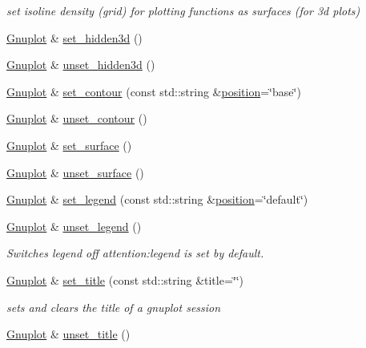 \begin{DoxyCompactItemize}
\begin{DoxyCompactList}\small\item\em set isoline density (grid) for plotting functions as surfaces (for 3d plots) \end{DoxyCompactList}\item 
\hyperlink{classGnuplot}{\-Gnuplot} \& \hyperlink{classGnuplot_a891f9800705eddc3f73886f265c009b8}{set\-\_\-hidden3d} ()
\item 
\hyperlink{classGnuplot}{\-Gnuplot} \& \hyperlink{classGnuplot_ab8688182047f746090e1e5f2a8c11c9e}{unset\-\_\-hidden3d} ()
\item 
\hyperlink{classGnuplot}{\-Gnuplot} \& \hyperlink{classGnuplot_af845efc728a90d7e10de764eff0b2423}{set\-\_\-contour} (const std\-::string \&\hyperlink{fri__example_8m_a6b7c93a885b43441f4e04026891e8c69}{position}=\char`\"{}base\char`\"{})
\item 
\hyperlink{classGnuplot}{\-Gnuplot} \& \hyperlink{classGnuplot_a0b8522cb81e46dd4f5a22b7b48f977b1}{unset\-\_\-contour} ()
\item 
\hyperlink{classGnuplot}{\-Gnuplot} \& \hyperlink{classGnuplot_a9825bd26500e30ca88404c4807e6607a}{set\-\_\-surface} ()
\item 
\hyperlink{classGnuplot}{\-Gnuplot} \& \hyperlink{classGnuplot_a4ebddacbec61aa3e7bc4b89f508ad621}{unset\-\_\-surface} ()
\item 
\hyperlink{classGnuplot}{\-Gnuplot} \& \hyperlink{classGnuplot_ad64a717dac18167f656c4f09239973f8}{set\-\_\-legend} (const std\-::string \&\hyperlink{fri__example_8m_a6b7c93a885b43441f4e04026891e8c69}{position}=\char`\"{}default\char`\"{})
\item 
\hyperlink{classGnuplot}{\-Gnuplot} \& \hyperlink{classGnuplot_ace901a18ab1a459213afd3ee0233b5ce}{unset\-\_\-legend} ()
\begin{DoxyCompactList}\small\item\em \-Switches legend off attention\-:legend is set by default. \end{DoxyCompactList}\item 
\hyperlink{classGnuplot}{\-Gnuplot} \& \hyperlink{classGnuplot_a4f93bac0e69dd83806652ca7226c6b3b}{set\-\_\-title} (const std\-::string \&title=\char`\"{}\char`\"{})
\begin{DoxyCompactList}\small\item\em sets and clears the title of a gnuplot session \end{DoxyCompactList}\item 
\hyperlink{classGnuplot}{\-Gnuplot} \& \hyperlink{classGnuplot_aca0aeb1dc0ac8d7e68ba6a15a977be28}{unset\-\_\-title} ()

\end{DoxyCompactItemize}
